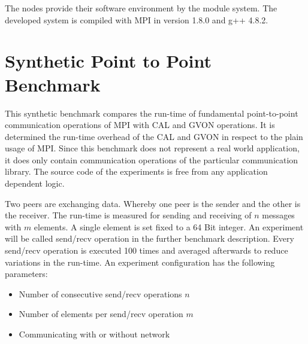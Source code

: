 

The nodes provide their software environment by the module system.
The developed system is compiled with MPI in version 1.8.0 and
g++ 4.8.2.  


\section{Synthetic Point to Point Benchmark}
This synthetic benchmark compares the run-time of fundamental
point-to-point communication operations of MPI with CAL and GVON
operations. It is determined the run-time overhead of the CAL and GVON
in respect to the plain usage of MPI. Since this benchmark does not
represent a real world application, it does only contain communication
operations of the particular communication library. The source code of
the experiments is free from any application dependent logic.

Two peers are exchanging data. Whereby one peer is the sender and the
other is the receiver. The run-time is measured for sending and
receiving of $n$ messages with $m$ elements.  A single element is set
fixed to a 64 Bit integer.  An experiment will be called send/recv
operation in the further benchmark description. Every send/recv
operation is executed 100 times and averaged afterwards to reduce
variations in the run-time. An experiment configuration has the
following parameters:

\begin{itemize}
  \item Number of consecutive send/recv operations $n$
  \item Number of elements per send/recv operation $m$
  \item Communicating with or without network
\end{itemize}

